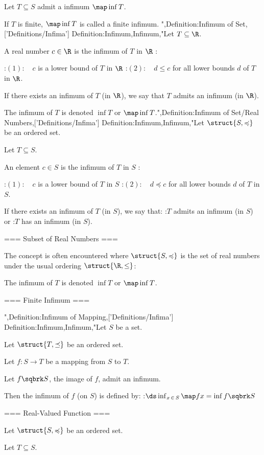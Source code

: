 Let $T \subseteq S$ admit a infimum $\map \inf T$.


If $T$ is finite, $\map \inf T$ is called a finite infimum.
",Definition:Infimum of Set,['Definitions/Infima']
Definition:Infimum,Infimum,"Let $T \subseteq \R$.


A real number $c \in \R$ is the infimum of $T$ in $\R$ :

:$(1): \quad c$ is a lower bound of $T$ in $\R$
:$(2): \quad d \le c$ for all lower bounds $d$ of $T$ in $\R$.


If there exists an infimum of $T$ (in $\R$), we say that $T$ admits an infimum (in $\R$).


The infimum of $T$ is denoted $\inf T$ or $\map \inf T$.",Definition:Infimum of Set/Real Numbers,['Definitions/Infima']
Definition:Infimum,Infimum,"Let $\struct {S, \preccurlyeq}$ be an ordered set.

Let $T \subseteq S$.


An element $c \in S$ is the infimum of $T$ in $S$ :

:$(1): \quad c$ is a lower bound of $T$ in $S$
:$(2): \quad d \preccurlyeq c$ for all lower bounds $d$ of $T$ in $S$.


If there exists an infimum of $T$ (in $S$), we say that:
:$T$ admits an infimum (in $S$) or
:$T$ has an infimum (in $S$).


=== Subset of Real Numbers ===

The concept is often encountered where $\struct {S, \preccurlyeq}$ is the set of real numbers under the usual ordering $\struct {\R, \le}$:



The infimum of $T$ is denoted $\inf T$ or $\map \inf T$.


=== Finite Infimum ===

",Definition:Infimum of Mapping,['Definitions/Infima']
Definition:Infimum,Infimum,"Let $S$ be a set.

Let $\struct {T, \preceq}$ be an ordered set.

Let $f: S \to T$ be a mapping from $S$ to $T$.

Let $f \sqbrk S$, the image of $f$, admit an infimum.


Then the infimum of $f$ (on $S$) is defined by:
:$\ds \inf_{x \mathop \in S} \map f x = \inf f \sqbrk S$


=== Real-Valued Function ===

Let $\struct {S, \preccurlyeq}$ be an ordered set.

Let $T \subseteq S$.


